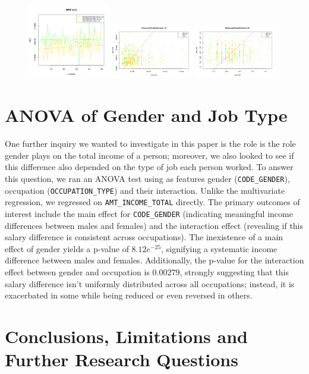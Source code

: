 \documentclass[12pt]{article}
\begin{document}
\begin{figure}[h]

\begin{center}
  \includegraphics[width=0.32\textwidth]{img/b3e6edc4-d69d-44de-a9ac-2cc9fe238ce1.png}
  \includegraphics[width=0.32\textwidth]{img/fad34756-2ddc-4e36-9baa-510610c4607b.png}
  \includegraphics[width=0.32\textwidth]{img/62da355a-02c0-46d7-a150-31d3cc70abe9.png}
\end{center}
\end{figure}\newpage
\section{ANOVA of Gender and Job Type}
One further inquiry we wanted to investigate in this paper is the role is the role gender plays on the total income of a person; moreover, we also looked to see if this difference also depended on the type of job each person worked. To answer this question, we ran an ANOVA test using as features gender (\verb|CODE_GENDER|), occupation (\verb|OCCUPATION_TYPE|) and their interaction. Unlike the multivariate regression, we regressed on \verb|AMT_INCOME_TOTAL| directly. The primary outcomes of interest include the main effect for \verb|CODE_GENDER| (indicating meaningful income differences between males and females) and the interaction effect (revealing if this salary difference is consistent across occupations). The inexistence of a main effect of gender yields a p-value of $8.12e^{-25}$, signifying a systematic income difference between males and females. Additionally, the p-value for the interaction effect between gender and occupation is $0.00279$, strongly suggesting that this salary difference isn’t uniformly distributed across all occupations; instead, it is exacerbated in some while being reduced or even reversed in others.

\section{Conclusions, Limitations and Further Research Questions}
\end{document}
